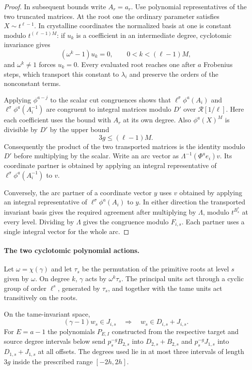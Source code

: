 \begin{proof}
In subsequent bounds write \(A_r=a_r\). Use polynomial representatives of the two
truncated matrices. At the root one the ordinary parameter
satisfies \(X\sim t^{\ell-1}\). In crystalline coordinates the
normalized basis at one is constant modulo \(t^{(\ell-1)M}\):
if \(u_k\) is a coefficient in an intermediate degree, cyclotomic invariance gives
\[
 (\omega^k-1)u_k=0,\qquad 0<k<(\ell-1)M ,
\]
and \(\omega^k\ne1\) forces \(u_k=0\). Every evaluated root reaches one after
\(a\) Frobenius steps, which transport this constant to
\(\lambda_i\) and preserve the orders of the nonconstant terms.

Applying \(\phi^{a-j}\) to the scalar cut congruences shows that
\(\ell^\sigma\phi^a(A_i)\) and
\(\ell^\sigma\phi^a(A_i^{-1})\) are congruent to integral
matrices modulo \(D'\) over \(\mathcal R[1/\ell]\).
Here each coefficient uses the bound with \(A_r\) at its own
degree. Also \(\phi^a(X)^M\) is divisible by \(D'\)
by the upper bound
\[
 3g\le(\ell-1)M.
\]
Consequently
the product of the two transported matrices is the identity
modulo \(D'\) before multiplying by the scalar.
Write an arc vector as \(\Lambda^{-1}(\Phi^a e_i)v\).
Its coordinate partner is obtained by applying an integral
representative of \(\ell^\sigma\phi^a(A_i^{-1})\) to \(v\).

Conversely, the arc partner of a coordinate vector \(y\)
uses \(v\) obtained by applying an integral representative
of \(\ell^\sigma\phi^a(A_i)\) to \(y\).
In either direction the transported invariant basis gives
the required agreement after multiplying by \(\Lambda\), modulo
\(t^{B_s^*}\) at every level. Dividing by \(\Lambda\) gives
the congruence modulo \(F_{i,s}\). Each partner uses a single
integral vector for the whole arc.
\end{proof}

\paragraph{The two cyclotomic polynomial actions.}\label{par:wach-polynomial-actions}
Let \(\omega=\chi(\gamma)\) and let \(\tau_s\) be the permutation
of the primitive roots at level \(s\) given by \(\omega\).
On degree \(k\), \(\gamma\) acts by \(\omega^k\tau_s\).
The principal units act through a cyclic group of order
\(\ell^s\), generated by \(\tau_s\), and together with
the tame units act transitively on the roots.

\begin{lemma}\label{lem:wach-level-polynomials}
On the tame-invariant space,
\[
 (\gamma-1)w_s\in J_{i,s}\quad\Longrightarrow\quad w_s\in D_{i,s}+J_{i,s}.
\] For \(E=a-1\) the polynomials
\(P_{E,I}\) constructed from the respective target and source
degree intervals below send \(p_s^{-g}B_{2,s}\) into
\(D_{2,s}+B_{2,s}\) and \(p_s^{-g}J_{1,s}\) into \(D_{1,s}+J_{1,s}\)
at all offsets. The degrees used lie in at most three intervals
of length \(3g\) inside the prescribed range \([-2h,2h]\).
\end{lemma}

